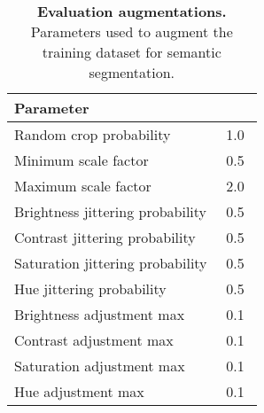 \begin{table}[ht]
\small
\centering
\caption{\textbf{Evaluation augmentations.} Parameters used to augment the training dataset for semantic segmentation.}
\begin{tabular}{l c}
    Parameter                           & $\hspace{1em} \hspace{1em}$  \\ \hline
    Random crop probability             & 1.0 \\
    Minimum scale factor                & 0.5 \\
    Maximum scale factor                & 2.0 \\
    Brightness jittering probability    & 0.5 \\
    Contrast jittering probability      & 0.5 \\
    Saturation jittering probability    & 0.5 \\
    Hue jittering probability           & 0.5 \\
    Brightness adjustment max           & 0.1 \\
    Contrast adjustment max             & 0.1 \\
    Saturation adjustment max           & 0.1 \\
    Hue adjustment max                  & 0.1 \\
\end{tabular}
\label{tab:appendix_eval_augmentations}
\end{table}